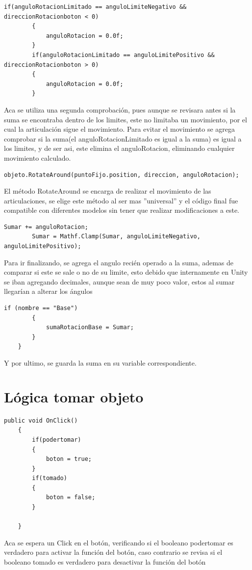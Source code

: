 \begin{lstlisting}[frame=single]
        if(anguloRotacionLimitado == anguloLimiteNegativo && direccionRotacionboton < 0)
        {
            anguloRotacion = 0.0f;
        }
        if(anguloRotacionLimitado == anguloLimitePositivo && direccionRotacionboton > 0)
        {
            anguloRotacion = 0.0f;
        }
\end{lstlisting}
Aca se utiliza una segunda comprobación, pues aunque se revisara antes si la suma se encontraba dentro de los limites, este no limitaba un movimiento, por el cual la articulación sigue el movimiento. Para evitar el movimiento se agrega comprobar si la suma(el anguloRotacionLimitado es igual a la suma) es igual a los limites, y de ser asi, este elimina el anguloRotacion, eliminando cualquier movimiento calculado.

\begin{lstlisting}[frame=single]
        objeto.RotateAround(puntoFijo.position, direccion, anguloRotacion);
\end{lstlisting}
El método RotateAround se encarga de realizar el movimiento de las articulaciones, se elige este método al ser mas ''universal'' y el código final fue compatible con diferentes modelos sin tener que realizar modificaciones a este.

\begin{lstlisting}[frame=single]
        Sumar += anguloRotacion;
        Sumar = Mathf.Clamp(Sumar, anguloLimiteNegativo, anguloLimitePositivo);
\end{lstlisting}
Para ir finalizando, se agrega el angulo recién operado a la suma, ademas de comparar si este se sale o no de su limite, esto debido que internamente en Unity se iban agregando decimales, aunque sean de muy poco valor, estos al sumar llegarían a alterar los ángulos

\begin{lstlisting}[frame=single]
        if (nombre == "Base")
        {
            sumaRotacionBase = Sumar;
        }
    }
\end{lstlisting}
Y por ultimo, se guarda la suma en su variable correspondiente.

\clearpage
\section{Lógica tomar objeto}

\begin{lstlisting}[frame=single]
    public void OnClick()
    {
        if(podertomar)
        {
            boton = true;
        }
        if(tomado)
        {
            boton = false;
        }
        
    }
\end{lstlisting}
Aca se espera un Click en el botón, verificando si el booleano podertomar es verdadero para activar la función del botón, caso contrario se revisa si el booleano tomado es verdadero para desactivar la función del botón

